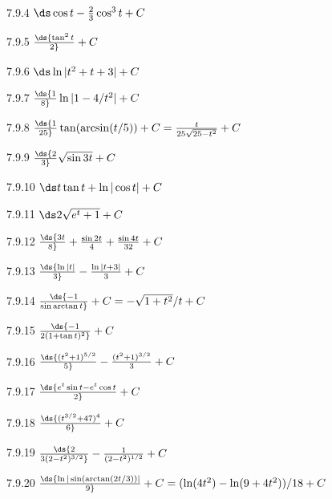 \begin{Answer}{7.9.4}
 $\ds\cos t-{2\over3}\cos^3 t+C$
\end{Answer}
\begin{Answer}{7.9.5}
 $\ds{\tan^2 t\over 2}+C$
\end{Answer}
\begin{Answer}{7.9.6}
 $\ds\ln|t^2+t+3|+C$
\end{Answer}
\begin{Answer}{7.9.7}
 $\ds {1\over8} \ln|1-4/t^2|+C$
\end{Answer}
\begin{Answer}{7.9.8}
 $\ds{1\over25}\tan(\arcsin(t/5))+C={t\over25\sqrt{25-t^2}}+C$
\end{Answer}
\begin{Answer}{7.9.9}
 $\ds{2\over3}\sqrt{\sin 3t}+C$
\end{Answer}
\begin{Answer}{7.9.10}
 $\ds t\tan t+\ln|\cos t|+C$
\end{Answer}
\begin{Answer}{7.9.11}
 $\ds 2\sqrt{e^t+1}+C$
\end{Answer}
\begin{Answer}{7.9.12}
 $\ds{3t\over 8}+{\sin 2t\over4}+ {\sin 4t\over 32}+C$
\end{Answer}
\begin{Answer}{7.9.13}
 $\ds{\ln |t|\over 3} - {\ln |t+3|\over 3}+C$
\end{Answer}
\begin{Answer}{7.9.14}
 $\ds{-1\over \sin\arctan t}+C=-\sqrt{1+t^2}/t+C$
\end{Answer}
\begin{Answer}{7.9.15}
 $\ds{-1\over 2(1+\tan t)^2}+C$
\end{Answer}
\begin{Answer}{7.9.16}
 $\ds{(t^2+1)^{5/2}\over 5}-{(t^2+1)^{3/2}\over 3}+C$
\end{Answer}
\begin{Answer}{7.9.17}
 $\ds{e^t\sin t-e^t\cos t\over 2}+C$
\end{Answer}
\begin{Answer}{7.9.18}
 $\ds{(t^{3/2}+47)^4\over6}+C$
\end{Answer}
\begin{Answer}{7.9.19}
 $\ds{2\over 3(2-t^2)^{3/2}}-{1\over(2-t^2)^{1/2}}+C$
\end{Answer}
\begin{Answer}{7.9.20}
 $\ds{\ln|\sin(\arctan(2t/3))|\over9}+C =
(\ln(4t^2)-\ln(9+4t^2))/18 + C$
\end{Answer}
